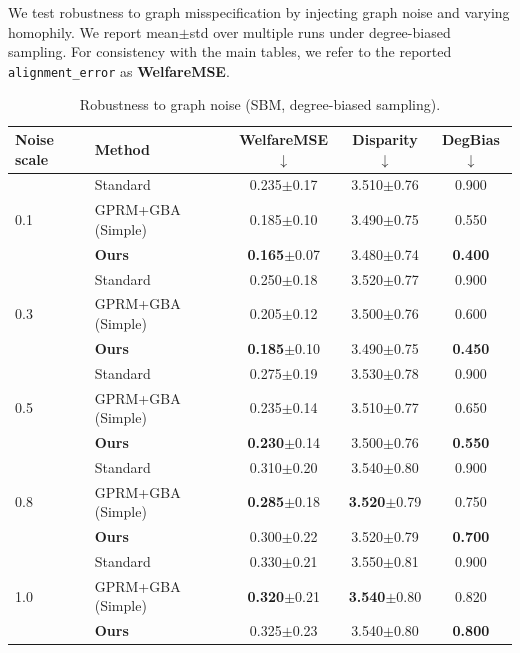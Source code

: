 \documentclass{article}
\theoremstyle{plain}
\theoremstyle{definition}
\theoremstyle{remark}
\begin{document}
We test robustness to graph misspecification by injecting graph noise and
varying homophily. We report mean$\pm$std over multiple runs under degree-biased
sampling. For consistency with the main tables, we refer to the reported
\texttt{alignment\_error} as \textbf{WelfareMSE}. 

\begin{table}[h]
\caption{Robustness to graph noise (SBM, degree-biased sampling).}
\label{tab:robustness}
\centering
\small
\begin{tabular}{llccc}
\toprule
\textbf{Noise scale} & \textbf{Method} & \textbf{WelfareMSE}$\downarrow$ & \textbf{Disparity}$\downarrow$ & \textbf{DegBias}$\downarrow$ \\
\midrule
\multirow{3}{*}{0.1}
& Standard & 0.235{\tiny$\pm$0.17} & 3.510{\tiny$\pm$0.76} & 0.900 \\
& GPRM+GBA (Simple) & 0.185{\tiny$\pm$0.10} & 3.490{\tiny$\pm$0.75} & 0.550 \\
& \textbf{Ours} & \textbf{0.165}{\tiny$\pm$0.07} & 3.480{\tiny$\pm$0.74} & \textbf{0.400} \\
\midrule
\multirow{3}{*}{0.3}
& Standard & 0.250{\tiny$\pm$0.18} & 3.520{\tiny$\pm$0.77} & 0.900 \\
& GPRM+GBA (Simple) & 0.205{\tiny$\pm$0.12} & 3.500{\tiny$\pm$0.76} & 0.600 \\
& \textbf{Ours} & \textbf{0.185}{\tiny$\pm$0.10} & 3.490{\tiny$\pm$0.75} & \textbf{0.450} \\
\midrule
\multirow{3}{*}{0.5}
& Standard & 0.275{\tiny$\pm$0.19} & 3.530{\tiny$\pm$0.78} & 0.900 \\
& GPRM+GBA (Simple) & 0.235{\tiny$\pm$0.14} & 3.510{\tiny$\pm$0.77} & 0.650 \\
& \textbf{Ours} & \textbf{0.230}{\tiny$\pm$0.14} & 3.500{\tiny$\pm$0.76} & \textbf{0.550} \\
\midrule
\multirow{3}{*}{0.8}
& Standard & 0.310{\tiny$\pm$0.20} & 3.540{\tiny$\pm$0.80} & 0.900 \\
& GPRM+GBA (Simple) & \textbf{0.285}{\tiny$\pm$0.18} & \textbf{3.520}{\tiny$\pm$0.79} & 0.750 \\
& \textbf{Ours} & 0.300{\tiny$\pm$0.22} & 3.520{\tiny$\pm$0.79} & \textbf{0.700} \\
\midrule
\multirow{3}{*}{1.0}
& Standard & 0.330{\tiny$\pm$0.21} & 3.550{\tiny$\pm$0.81} & 0.900 \\
& GPRM+GBA (Simple) & \textbf{0.320}{\tiny$\pm$0.21} & \textbf{3.540}{\tiny$\pm$0.80} & 0.820 \\
& \textbf{Ours} & 0.325{\tiny$\pm$0.23} & 3.540{\tiny$\pm$0.80} & \textbf{0.800} \\
\bottomrule
\end{tabular}
\end{table}
\end{document}
